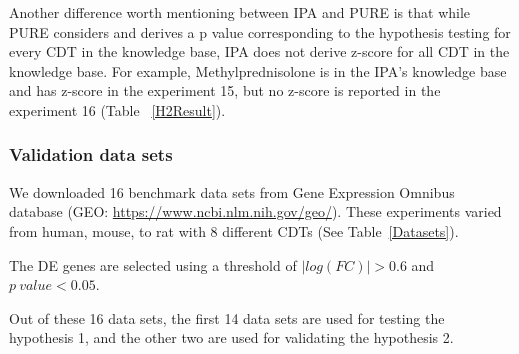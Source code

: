 \documentclass[Minh_PhD_thesis.tex]{subfiles}
\begin{document}
Another  difference worth mentioning between IPA and PURE is that while PURE considers and derives a p value corresponding to the hypothesis testing for every CDT in the knowledge base, IPA does not derive z-score for all CDT in the knowledge base. For example, Methylprednisolone is in the IPA's knowledge base and has z-score in the experiment 15, but no z-score is reported in the experiment 16 (Table ~\ref{H2Result}).


\subsubsection{Validation data sets}

We downloaded 16 benchmark data sets from Gene Expression Omnibus database (GEO: \url{https://www.ncbi.nlm.nih.gov/geo/}). 
These experiments varied from human, mouse, to rat with 8 different CDTs (See Table~\ref{Datasets}).

The DE genes are selected using a threshold of $|log(FC)| > 0.6$ and $p\ value < 0.05$.

Out of these 16 data sets, the first 14 data sets are used for testing the hypothesis 1, and the other two are used for validating the hypothesis 2.
\end{document}
